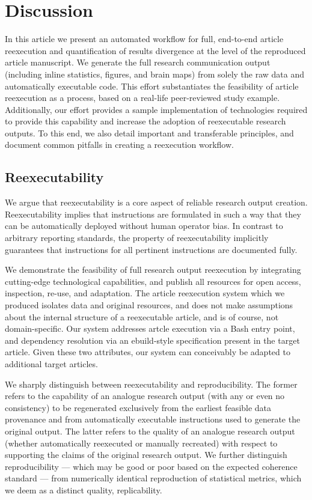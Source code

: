 \section{Discussion}

In this article we present an automated workflow for full, end-to-end article reexecution and quantification of results divergence at the level of the reproduced article manuscript.
We generate the full research communication output (including inline statistics, figures, and brain maps) from solely the raw data and automatically executable code.
This effort substantiates the feasibility of article reexecution as a process, based on a real-life peer-reviewed study example.
Additionally, our effort provides a sample implementation of technologies required to provide this capability and increase the adoption of reexecutable research outputs.
To this end, we also detail important and transferable principles, and document common pitfalls in creating a reexecution workflow.

\subsection{Reexecutability}
We argue that reexecutability is a core aspect of reliable research output creation.
Reexecutability implies that instructions are formulated in such a way that they can be automatically deployed without human operator bias.
In contrast to arbitrary reporting standards, the property of reexecutability implicitly guarantees that instructions for all pertinent instructions are documented fully.

We demonstrate the feasibility of full research output reexecution by integrating cutting-edge technological capabilities, and publish all resources for open access, inspection, re-use, and adaptation.
The article reexecution system which we produced isolates data and original resources, and does not make assumptions about the internal structure of a reexecutable article, and is of course, not domain-specific.
Our system addresses artcle execution via a Bash entry point, and dependency resolution via an ebuild-style specification present in the target article.
Given these two attributes, our system can conceivably be adapted to additional target articles.

We sharply distinguish between reexecutability and reproducibility.
The former refers to the capability of an analogue research output (with any or even no consistency) to be regenerated exclusively from the earliest feasible data provenance and from automatically executable instructions used to generate the original output.
The latter refers to the quality of an analogue research output (whether automatically reexecuted or manually recreated) with respect to supporting the claims of the original research output.
We further distinguish reproducibility — which may be good or poor based on the expected coherence standard — from numerically identical reproduction of statistical metrics, which we deem as a distinct quality, replicability.


